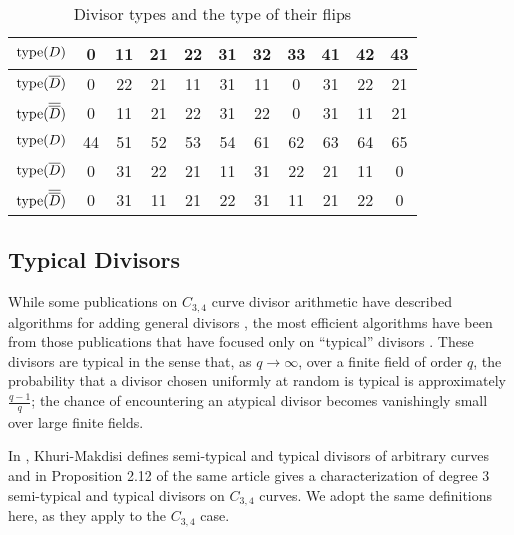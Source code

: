 \begin{table}[h!]
\caption{Divisor types and the type of their flips}
\label{tab_large_flip_type}
\begin{center}
  \begin{tabular}{r|cccccccccc}
    $\operatorname{type}(D)$             & 0 & 11 & 21 & 22 & 31 & 32 & 33 & 41 & 42 & 43 \\
    \hline
    $\operatorname{type}(\overline D)$        & 0 & 22 & 21 & 11 & 31 & 11 &  0 & 31 & 22 & 21 \\
    $\operatorname{type}(\overline {\overline D})$ & 0 & 11 & 21 & 22 & 31 & 22 &  0 & 31 & 11 & 21 \\
    \hline\hline
    $\operatorname{type}(D)$             & 44 & 51 & 52 & 53 & 54 & 61 & 62 & 63 & 64 & 65 \\
    \hline
    $\operatorname{type}(\overline D)$        &  0 & 31 & 22 & 21 & 11 & 31 & 22 & 21 & 11 &  0 \\
    $\operatorname{type}(\overline {\overline D})$ &  0 & 31 & 11 & 21 & 22 & 31 & 11 & 21 & 22 &  0 \\
  \end{tabular}
\end{center}
\end{table}



\subsection{Typical Divisors}

While some publications on $C_{3,4}$ curve divisor arithmetic have described algorithms for adding general divisors
\cite{arita05-2, harasawa00},
the most efficient algorithms have been from those publications that have focused only on ``typical'' divisors
\cite{salem07, kmakdisi18, flon08}.
These divisors are typical in the sense that, as $q \to \infty$,
over a finite field of order $q$,
the probability that a divisor chosen uniformly at random is typical is approximately $\frac {q - 1} q$;
the chance of encountering an atypical divisor becomes vanishingly small over large finite fields.

In \cite{kmakdisi18}, Khuri-Makdisi defines semi-typical and typical divisors of arbitrary curves
and in Proposition 2.12 of the same article gives a characterization of degree 3
semi-typical and typical divisors on $C_{3,4}$ curves.
We adopt the same definitions here, as they apply to the $C_{3,4}$ case.

